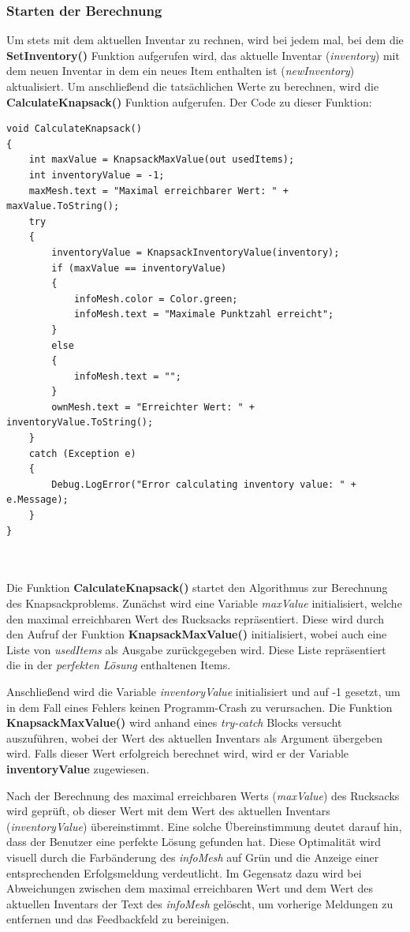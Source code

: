 \subsubsection{Starten der Berechnung}
Um stets mit dem aktuellen Inventar zu rechnen, wird bei jedem mal, bei dem die \textbf{SetInventory()} Funktion
aufgerufen wird, das aktuelle Inventar (\textit{inventory}) mit dem neuen Inventar in dem ein neues Item enthalten ist
(\textit{newInventory}) aktualisiert. Um anschließend die tatsächlichen Werte zu berechnen, wird die \textbf{CalculateKnapsack()}
Funktion aufgerufen. Der Code zu dieser Funktion:
\begin{lstlisting}[style=csharp, caption={Berechnungsfunktion}, label=code:kn_calc]
void CalculateKnapsack()
{
    int maxValue = KnapsackMaxValue(out usedItems);
    int inventoryValue = -1;
    maxMesh.text = "Maximal erreichbarer Wert: " + maxValue.ToString();
    try
    {
        inventoryValue = KnapsackInventoryValue(inventory);
        if (maxValue == inventoryValue)
        {
            infoMesh.color = Color.green;
            infoMesh.text = "Maximale Punktzahl erreicht";
        }
        else
        {
            infoMesh.text = "";
        }
        ownMesh.text = "Erreichter Wert: " + inventoryValue.ToString();
    }
    catch (Exception e)
    {
        Debug.LogError("Error calculating inventory value: " + e.Message);
    }
}
\end{lstlisting}\\
\\
Die Funktion \textbf{CalculateKnapsack()} startet den Algorithmus zur Berechnung des Knapsackproblems. Zunächst wird eine
Variable \textit{maxValue} initialisiert, welche den maximal erreichbaren Wert des Rucksacks repräsentiert. Diese wird
durch den Aufruf der Funktion \textbf{KnapsackMaxValue()} initialisiert, wobei auch eine Liste von \textit{usedItems}
als Ausgabe zurückgegeben wird. Diese Liste repräsentiert die in der \textit{perfekten Lösung} enthaltenen Items.

Anschließend wird die Variable \textit{inventoryValue} initialisiert und auf -1 gesetzt, um in dem Fall eines Fehlers
keinen Programm-Crash zu verursachen. Die Funktion \textbf{KnapsackMaxValue()} wird anhand eines \textit{try-catch} Blocks
versucht auszuführen, wobei der Wert des aktuellen Inventars als Argument übergeben wird. Falls dieser Wert erfolgreich
berechnet wird, wird er der Variable \textbf{inventoryValue} zugewiesen.

Nach der Berechnung des maximal erreichbaren Werts (\textit{maxValue}) des Rucksacks wird geprüft, ob dieser Wert mit dem
Wert des aktuellen Inventars (\textit{inventoryValue}) übereinstimmt. Eine solche Übereinstimmung deutet darauf hin, dass
der Benutzer eine perfekte Lösung gefunden hat. Diese Optimalität wird visuell durch die Farbänderung des \textit{infoMesh}
auf Grün und die Anzeige einer entsprechenden Erfolgsmeldung verdeutlicht. Im Gegensatz dazu wird bei Abweichungen zwischen
dem maximal erreichbaren Wert und dem Wert des aktuellen Inventars der Text des \textit{infoMesh} gelöscht, um vorherige
Meldungen zu entfernen und das Feedbackfeld zu bereinigen.

